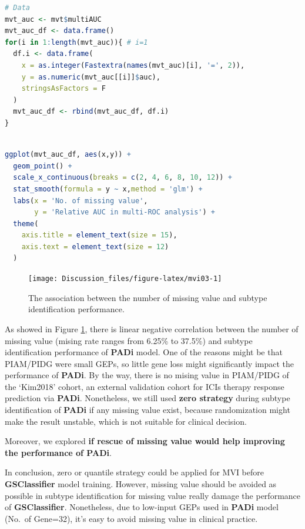 \documentclass[
  12pt,
]{book}
\begin{document}
\begin{lstlisting}[language=R]
# Data
mvt_auc <- mvt$multiAUC
mvt_auc_df <- data.frame()
for(i in 1:length(mvt_auc)){ # i=1
  df.i <- data.frame(
    x = as.integer(Fastextra(names(mvt_auc)[i], '=', 2)),
    y = as.numeric(mvt_auc[[i]]$auc),
    stringsAsFactors = F
  )
  mvt_auc_df <- rbind(mvt_auc_df, df.i)
}
  
\end{lstlisting}

\begin{lstlisting}[language=R]
ggplot(mvt_auc_df, aes(x,y)) +
  geom_point() +
  scale_x_continuous(breaks = c(2, 4, 6, 8, 10, 12)) + 
  stat_smooth(formula = y ~ x,method = 'glm') +
  labs(x = 'No. of missing value', 
       y = 'Relative AUC in multi-ROC analysis') +
  theme(
    axis.title = element_text(size = 15),
    axis.text = element_text(size = 12)
  )
\end{lstlisting}

\begin{figure}

{\centering \texttt{[image: Discussion\_files/figure-latex/mvi03-1]} 

}

\caption{The association between the number of missing value and subtype identification performance.}\label{fig:mvi03}
\end{figure}

As showed in Figure \ref{fig:mvi03}, there is linear negative correlation between the number of missing value (mising rate ranges from 6.25\% to 37.5\%) and subtype identification performance of \textbf{PADi} model. One of the reasons might be that PIAM/PIDG were small GEPs, so little gene loss might significantly impact the performance of \textbf{PADi}. By the way, there is no mising value in PIAM/PIDG of the `Kim2018' cohort, an external validation cohort for ICIs therapy response prediction via \textbf{PADi}. Nonetheless, we still used \textbf{zero strategy} during subtype identification of \textbf{PADi} if any missing value exist, because randomization might make the result unstable, which is not suitable for clinical decision.

Moreover, we explored \textbf{if rescue of missing value would help improving the performance of PADi}.

In conclusion, zero or quantile strategy could be applied for MVI before \textbf{GSClassifier} model training. However, missing value should be avoided as possible in subtype identification for missing value really damage the performance of \textbf{GSClassifier}. Nonetheless, due to low-input GEPs used in \textbf{PADi} model (No.~of Gene=32), it's easy to avoid missing value in clinical practice.
\end{document}
